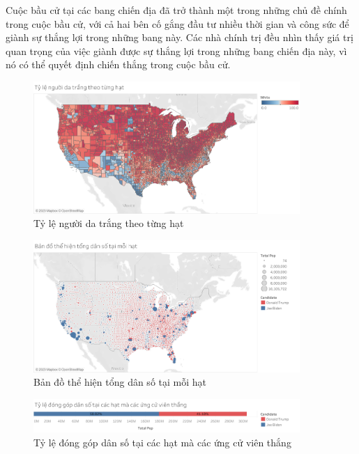 \documentclass[14pt, a4paper]{article}
\numberwithin{equation}{section}
\numberwithin{figure}{section}
\numberwithin{dl}{section}
\numberwithin{md}{section}
\numberwithin{bd}{section}
\numberwithin{dn}{section}
\numberwithin{hq}{section}
\begin{document}
    Cuộc bầu cử tại các bang chiến địa đã trở thành một trong những chủ đề chính trong cuộc bầu cử, với cả hai bên cố gắng đầu tư nhiều thời gian và công sức để giành sự thắng lợi trong những bang này. 
    Các nhà chính trị đều nhìn thấy giá trị quan trọng của việc giành được sự thắng lợi trong những bang chiến địa này, vì nó có thể quyết định chiến thắng trong cuộc bầu cử.

    \begin{figure}[h!]
        \centering
        \includegraphics[width=0.9\textwidth]{figures/County_Percentage_White_People.png}
        \caption{Tỷ lệ người da trắng theo từng hạt}
    \end{figure}

    \begin{figure}[h!]
        \centering
        \includegraphics[width=0.9\textwidth]{figures/County_Total_Population_Circle.png}
        \caption{Bản đồ thể hiện tổng dân số tại mỗi hạt}
    \end{figure}

    \begin{figure}[h!]
        \centering
        \includegraphics[width=0.9\textwidth]{figures/County_Percentage_Population_Candidate.png}
        \caption{Tỷ lệ đóng góp dân số tại các hạt mà các ứng cử viên thắng}
    \end{figure}
\end{document}
